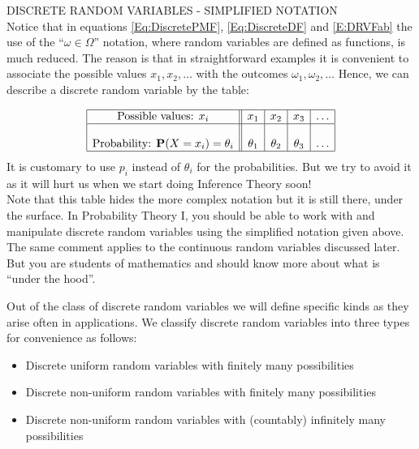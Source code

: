 \begin{framed}
DISCRETE RANDOM VARIABLES - SIMPLIFIED NOTATION\\

Notice that in equations \eqref{Eq:DiscretePMF}, \eqref{Eq:DiscreteDF} and \eqref{E:DRVFab} the use of the ``$\omega \in \Omega$'' notation, where random variables are defined as functions, is
much reduced. The reason is that in straightforward examples it is
convenient to associate the possible values $x_1,x_2,\dots$ with the
outcomes $\omega_1,\omega_2,\dots$ Hence, we can describe a discrete
random variable by the table:


$$\begin{array}{|c||c|c|c|c|}\hline
\textrm{Possible values: $x_i$} & x_1 & x_2 & x_3 & \ldots \\ \hline
&&&&\\
\textrm{Probability: $\mathbf{P}(X=x_i)=\theta_i$}& \theta_1 & \theta_2 & \theta_3 & \ldots \\ \hline
\end{array}
$$
It is customary to use $p_i$ instead of $\theta_i$ for the probabilities. But we try to avoid it as it will hurt us when we start doing Inference Theory soon!
\quad \\
Note that this table hides the more complex notation but it is still
there, under the surface. 
In Probability Theory I, you should be able to  work with and manipulate discrete random variables using the simplified notation given above. 
The same comment applies to the continuous random variables discussed later. But you are students of mathematics and should know more about what is ``under the hood''.

\end{framed}


Out of the class of discrete random variables we will define specific kinds as they arise often in applications.  We classify discrete random variables into three types for convenience as follows:
\begin{itemize}
\item {Discrete uniform random variables with finitely many possibilities}
\item {Discrete non-uniform random variables with finitely many possibilities}
\item {Discrete non-uniform random variables with (countably) infinitely many possibilities}
\end{itemize}


